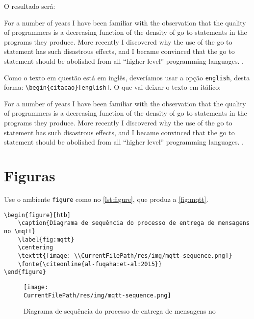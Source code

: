 O resultado será:

\begin{citacao}
	For a number of years I have been familiar with the observation that 
	the quality of programmers is a decreasing function of the density of 
	go to statements in the programs they produce. More recently I 
	discovered why the use of the go to statement has such disastrous 
	effects, and I became convinced that the go to statement should be 
	abolished from all \enquote{higher level} programming languages. 
	\cite{dijkstra:goto:1968}.
\end{citacao}

Como o texto em questão está em inglês, deveríamos usar a opção \texttt{english}, desta forma: 
\texttt{\textbackslash begin\{citacao\}[english]}. O que vai deixar o texto em itálico:

\begin{citacao}[english]
	For a number of years I have been familiar with the observation that 
	the quality of programmers is a decreasing function of the density of 
	go to statements in the programs they produce. More recently I 
	discovered why the use of the go to statement has such disastrous 
	effects, and I became convinced that the go to statement should be 
	abolished from all \enquote{higher level} programming languages. 
	\cite{dijkstra:goto:1968}.
\end{citacao}

\section{Figuras}

Use o ambiente \texttt{figure} como no \autoref{lst:figure}, que produz a \autoref{fig:mqtt}.

\begin{lstlisting}[float=htb, style=latexStyle, caption={Adição de imagem}, label=lst:figure]
\begin{figure}[htb]
	\caption{Diagrama de sequência do processo de entrega de mensagens no \mqtt}
	\label{fig:mqtt}
	\centering
	\texttt{[image: \\CurrentFilePath/res/img/mqtt-sequence.png]}
	\fonte{\citeonline{al-fuqaha:et-al:2015}}
\end{figure}
\end{lstlisting}

\begin{figure}[htb]
	\caption{Diagrama de sequência do processo de entrega de mensagens no \mqtt}
	\label{fig:mqtt}
	\centering
	\texttt{[image: \\CurrentFilePath/res/img/mqtt-sequence.png]}
\end{figure}

